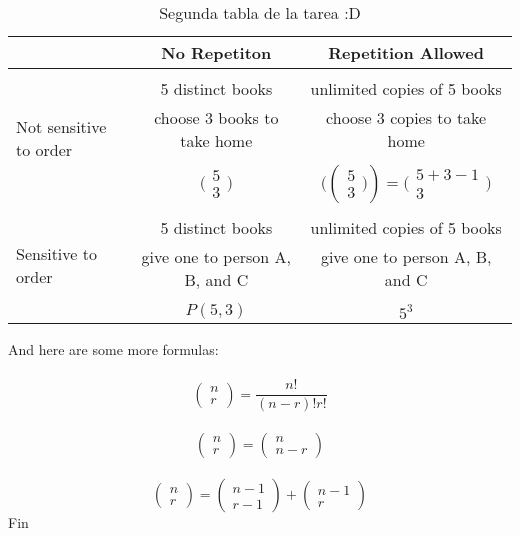 \documentclass[10pt,onecolumn,letterpaper]{article}
\begin{document}
\begin{table}[h!]
\begin{center}
\begin{tabular}{|l||c|c|}
    \hline
     &No Repetiton&Repetition Allowed \\ \hline \hline
    \multirow{5}{*}{Not sensitive to order}& & \\
    &5 distinct books &unlimited copies of 5 books\\
    &choose 3 books to take home &choose 3 copies to take home\\
    & & \\
    & $\big(\begin{smallmatrix}
  5\\
  3 
\end{smallmatrix}\big)$ &$\big((\begin{smallmatrix}
  5\\
  3 
\end{smallmatrix}\big))=\big(\begin{smallmatrix}
  5+3-1\\
  3 
\end{smallmatrix}\big)$\\\hline
        \multirow{5}{*}{Sensitive to order}& & \\
    &5 distinct books &unlimited copies of 5 books\\
    &give one to person A, B, and C &give one to person A, B, and C\\
    & & \\
    &$P(5,3)$ &$5^3$ \\
    \hline
\end{tabular}\caption{Segunda tabla de la tarea :D}
\end{center}
\label{Segunda2 tablal}
\end{table}
\newpage
And here are some more formulas:\\
\\
$$\begin{pmatrix}
  n\\ 
  r 
\end{pmatrix}=\frac{n!}{(n-r)!r!}$$\newline
\\
$$\begin{pmatrix}
  n\\ 
  r 
\end{pmatrix}=\begin{pmatrix}
  n\\ 
  n-r 
\end{pmatrix}$$\newline
\\
$$\begin{pmatrix}
  n\\ 
  r 
\end{pmatrix}=\begin{pmatrix}
  n-1\\ 
  r-1 
\end{pmatrix}+\begin{pmatrix}
  n-1\\ 
  r 
\end{pmatrix}$$
Fin
\newpage
\end{document}

